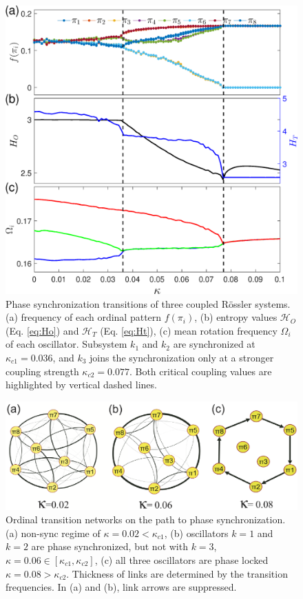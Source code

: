 \begin{figure}[ht]
	\centering
	\includegraphics[width=0.6\columnwidth]{Chapter07_Applications/rosslerSync.eps}
\caption{Phase synchronization transitions of three coupled R\"ossler systems. (a) frequency of each ordinal pattern $f(\pi_i)$, (b) entropy values $\mathcal{H}_O$ (Eq. \eqref{eq:Ho}) and $\mathcal{H}_T$ (Eq. \eqref{eq:Ht}), (c) mean rotation frequency $\Omega_i$ of each oscillator. Subsystem $k_1$ and $k_2$ are synchronized at $\kappa_{c1}=0.036$, and $k_3$ joins the synchronization only at a stronger coupling strength $\kappa_{c2}=0.077$. Both critical coupling values are highlighted by vertical dashed lines. \label{fig:rosslerSync}}
\end{figure}

\begin{figure}[ht]
	\centering
	\includegraphics[width=0.7\columnwidth]{Chapter07_Applications/sync_net.eps}
\caption{Ordinal transition networks on the path to phase synchronization. (a) non-sync regime of $\kappa = 0.02 < \kappa_{c1}$, (b) oscillators $k=1$ and $k=2$ are phase synchronized, but not with $k=3$, $\kappa = 0.06 \in [\kappa_{c1}, \kappa_{c2}]$, (c) all three oscillators are phase locked $\kappa = 0.08 > \kappa_{c2}$. Thickness of links are determined by the transition frequencies. In (a) and (b), link arrows are suppressed. \label{fig:rosslerSyncNet}}
\end{figure}

